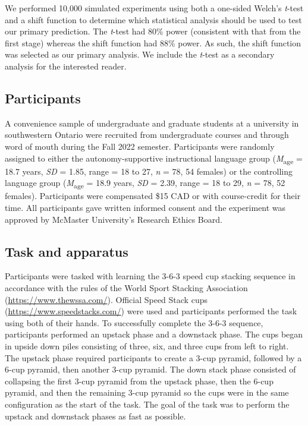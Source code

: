 \documentclass[
  doc, donotrepeattitle,floatsintext]{apa7}
\begin{document}
We performed 10,000 simulated experiments using both a one-sided Welch's \emph{t}-test and a shift function to determine which statistical analysis should be used to test our primary prediction. The \emph{t}-test had 80\% power (consistent with that from the first stage) whereas the shift function had 88\% power. As such, the shift function was selected as our primary analysis. We include the \emph{t}-test as a secondary analysis for the interested reader.

\hypertarget{participants}{%
\subsection{Participants}\label{participants}}

A convenience sample of undergraduate and graduate students at a university in southwestern Ontario were recruited from undergraduate courses and through word of mouth during the Fall 2022 semester. Participants were randomly assigned to either the autonomy-supportive instructional language group (\emph{M}\textsubscript{age} = 18.7 years, \emph{SD} = 1.85, range = 18 to 27, \emph{n} = 78, 54 females) or the controlling language group (\emph{M}\textsubscript{age} = 18.9 years, \emph{SD} = 2.39, range = 18 to 29, \emph{n} = 78, 52 females). Participants were compensated \$15 CAD or with course-credit for their time. All participants gave written informed consent and the experiment was approved by McMaster University's Research Ethics Board.

\hypertarget{task-and-apparatus}{%
\subsection{Task and apparatus}\label{task-and-apparatus}}

Participants were tasked with learning the 3-6-3 speed cup stacking sequence in accordance with the rules of the World Sport Stacking Association (\url{https://www.thewssa.com/}). Official Speed Stack cups (\url{https://www.speedstacks.com/}) were used and participants performed the task using both of their hands. To successfully complete the 3-6-3 sequence, participants performed an upstack phase and a downstack phase. The cups began in upside down piles consisting of three, six, and three cups from left to right. The upstack phase required participants to create a 3-cup pyramid, followed by a 6-cup pyramid, then another 3-cup pyramid. The down stack phase consisted of collapsing the first 3-cup pyramid from the upstack phase, then the 6-cup pyramid, and then the remaining 3-cup pyramid so the cups were in the same configuration as the start of the task. The goal of the task was to perform the upstack and downstack phases as fast as possible.
\end{document}
